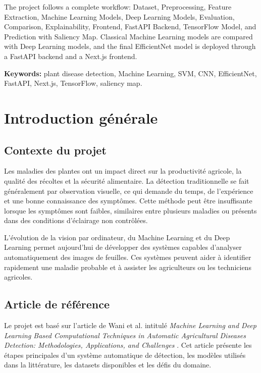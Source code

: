 \documentclass[12pt,a4paper]{report}
\begin{document}
The project follows a complete workflow: Dataset, Preprocessing, Feature Extraction, Machine Learning Models, Deep Learning Models, Evaluation, Comparison, Explainability, Frontend, FastAPI Backend, TensorFlow Model, and Prediction with Saliency Map. Classical Machine Learning models are compared with Deep Learning models, and the final EfficientNet model is deployed through a FastAPI backend and a Next.js frontend.

\textbf{Keywords:} plant disease detection, Machine Learning, SVM, CNN, EfficientNet, FastAPI, Next.js, TensorFlow, saliency map.

\tableofcontents
\listoffigures
\listoftables
\newpage


\chapter{Introduction générale}

\section{Contexte du projet}
Les maladies des plantes ont un impact direct sur la productivité agricole, la qualité des récoltes et la sécurité alimentaire. La détection traditionnelle se fait généralement par observation visuelle, ce qui demande du temps, de l'expérience et une bonne connaissance des symptômes. Cette méthode peut être insuffisante lorsque les symptômes sont faibles, similaires entre plusieurs maladies ou présents dans des conditions d'éclairage non contrôlées.

L'évolution de la vision par ordinateur, du Machine Learning et du Deep Learning permet aujourd'hui de développer des systèmes capables d'analyser automatiquement des images de feuilles. Ces systèmes peuvent aider à identifier rapidement une maladie probable et à assister les agriculteurs ou les techniciens agricoles.

\section{Article de référence}
Le projet est basé sur l'article de Wani et al. intitulé \textit{Machine Learning and Deep Learning Based Computational Techniques in Automatic Agricultural Diseases Detection: Methodologies, Applications, and Challenges} \cite{wani2021}. Cet article présente les étapes principales d'un système automatique de détection, les modèles utilisés dans la littérature, les datasets disponibles et les défis du domaine.
\end{document}

